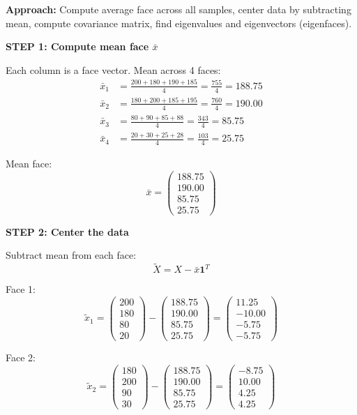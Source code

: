 \documentclass[12pt]{article}
\begin{document}
\begin{solution}

\textbf{Approach:} Compute average face across all samples, center data by subtracting mean, compute covariance matrix, find eigenvalues and eigenvectors (eigenfaces).

\textbf{STEP 1: Compute mean face $\bar{x}$}

Each column is a face vector. Mean across 4 faces:
\begin{align*}
\bar{x}_1 &= \frac{200 + 180 + 190 + 185}{4} = \frac{755}{4} = 188.75 \\
\bar{x}_2 &= \frac{180 + 200 + 185 + 195}{4} = \frac{760}{4} = 190.00 \\
\bar{x}_3 &= \frac{80 + 90 + 85 + 88}{4} = \frac{343}{4} = 85.75 \\
\bar{x}_4 &= \frac{20 + 30 + 25 + 28}{4} = \frac{103}{4} = 25.75
\end{align*}

Mean face:
\[
\bar{x} = \begin{pmatrix}
188.75 \\
190.00 \\
85.75 \\
25.75
\end{pmatrix}
\]

\textbf{STEP 2: Center the data}

Subtract mean from each face:
\[
\tilde{X} = X - \bar{x}\mathbf{1}^T
\]

Face 1:
\[
\tilde{x}_1 = \begin{pmatrix}
200 \\
180 \\
80 \\
20
\end{pmatrix} - \begin{pmatrix}
188.75 \\
190.00 \\
85.75 \\
25.75
\end{pmatrix} = \begin{pmatrix}
11.25 \\
-10.00 \\
-5.75 \\
-5.75
\end{pmatrix}
\]

Face 2:
\[
\tilde{x}_2 = \begin{pmatrix}
180 \\
200 \\
90 \\
30
\end{pmatrix} - \begin{pmatrix}
188.75 \\
190.00 \\
85.75 \\
25.75
\end{pmatrix} = \begin{pmatrix}
-8.75 \\
10.00 \\
4.25 \\
4.25
\end{pmatrix}
\]


\end{solution}
\end{document}
